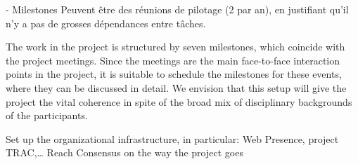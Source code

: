 

  - Milestones
    Peuvent être des réunions de pilotage (2 par an), en justifiant
    qu'il n'y a pas de grosses dépendances entre tâches.


The work in the \TheProject project is structured by seven milestones,
which coincide with the project meetings.  Since the meetings are the
main face-to-face interaction points in the project, it is suitable to
schedule the milestones for these events, where they can be discussed
in detail. We envision that this setup will give the project the vital
coherence in spite of the broad mix of disciplinary backgrounds of the
participants.

\begin{milestones}
    {Set up the organizational infrastructure, in particular: Web Presence, project TRAC,\ldots}
   {Reach Consensus on the
    way the project goes}
\end{milestones}


